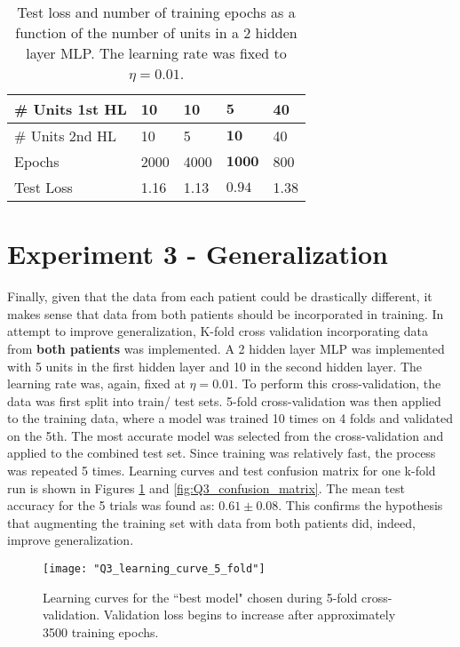 \documentclass{article}[12 pt]
\begin{document}
\begin{table}[H]
	\caption{Test loss and number of training epochs as a function of the number of units in a 2 hidden layer MLP.  The learning rate was fixed to $\eta=0.01$.}
	\label{tab:Q2_number_hidden_units_variation}
	\begin{center}
		\begin{tabularx}{\textwidth}{ |X|X|X|X|X| } 
			\hline
			\# Units 1st HL & 10 & 10 & $\bm{5}$ & 40\\
			\hline
			\# Units 2nd HL & 10 & 5 & $\bm{10}$ & 40\\
			\hline
			Epochs & 2000 & 4000 & $\bm{1000}$ & 800\\
			\hline
			Test Loss & 1.16 & 1.13 & $\bm{0.94}$ & 1.38\\
			\hline
		\end{tabularx}
	\end{center}
\end{table}

\section*{Experiment 3 - Generalization}
Finally, given that the data from each patient could be drastically different, it makes sense that data from both patients should be incorporated in training. In attempt to improve generalization, K-fold cross validation incorporating data from \textbf{both patients} was implemented.  A 2 hidden layer MLP was implemented with 5 units in the first hidden layer and 10 in the second hidden layer.  The learning rate was, again, fixed at $\eta=0.01$.   To perform this cross-validation, the data was first split into train/ test sets.  5-fold cross-validation was then applied to the training data, where a model was trained 10 times on 4 folds and validated on the 5th.  The most accurate model was selected from the cross-validation and applied to the combined test set.  Since training was relatively fast, the process was repeated 5 times.  Learning curves and test confusion matrix for one k-fold run is shown in Figures \ref*{fig:Q3_learning_curve} and \ref{fig:Q3_confusion_matrix}.  The mean test accuracy for the 5 trials was found as: $0.61 \pm 0.08$.  This confirms the hypothesis that augmenting the training set with data from both patients did, indeed, improve generalization.

\begin{center}
	\begin{figure}[H]
		\centering
		\texttt{[image: "Q3\_learning\_curve\_5\_fold"]}
		\caption{Learning curves for the ``best model" chosen during 5-fold cross-validation.  Validation loss begins to increase after approximately 3500 training epochs.}
		\label{fig:Q3_learning_curve}
	\end{figure}
\end{center}
\end{document}
